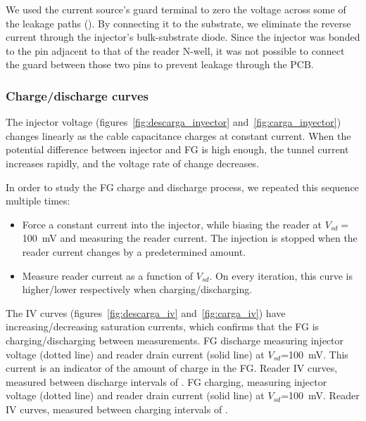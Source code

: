 We used the current source's guard terminal to zero the voltage across some of the leakage paths
().
By connecting it to the substrate,
we eliminate the reverse current through the injector's bulk-substrate diode.
Since the injector was bonded to the pin adjacent to that of the reader N-well,
it was not possible to connect the guard between those two pins 
to prevent leakage through the PCB.
\subsubsection{Charge/discharge curves}
The injector voltage (figures~\ref{fig:descarga_inyector}
and~\ref{fig:carga_inyector})
changes linearly as the cable capacitance charges at constant current.
When the potential difference between injector and FG is high enough,
the tunnel current increases rapidly, and the voltage rate of change decreases.

In order to study the FG charge and discharge process,
we repeated this sequence multiple times:
\begin{itemize}
    \item Force a constant current into the injector,
        while biasing the reader at $V_{sd}=$\SI{100}{\milli\volt}
        and measuring the reader current.
        The injection is stopped when the reader current changes by a predetermined amount.
    \item Measure reader current as a function of $V_{sd}$.
        On every iteration, this curve is higher/lower respectively when charging/discharging.
\end{itemize}

The IV curves (figures~\ref{fig:descarga_iv}
and~\ref{fig:carga_iv}) have increasing/decreasing saturation currents,
which confirms that the FG is charging/discharging
between measurements.
{FG discharge measuring injector voltage (dotted line) and
reader drain current (solid line) at
$V_{sd}$=\SI{100}{\milli\volt}.
This current is an indicator of the amount of charge in the FG.}
{Reader IV curves, measured between discharge intervals of
    .}
{FG charging, measuring injector voltage (dotted line) and
reader drain current (solid line) at
$V_{sd}$=\SI{100}{\milli\volt}.}
{Reader IV curves, measured between charging intervals of
    .}
